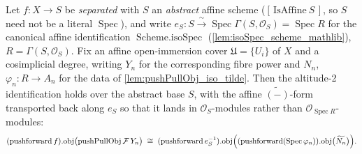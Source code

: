 \begin{lemma}\leanok
  \label{lem:pushPullObj_iso_tilde_affine}
  Let \(f : X \to S\) be \emph{separated} with \(S\) an \emph{abstract} affine scheme
  (\([\,\mathrm{IsAffine}\ S\,]\), so \(S\) need not be a literal \(\operatorname{Spec}\)), and
  write \(e_S : S \xrightarrow{\ \sim\ } \operatorname{Spec}\Gamma(S, \mathcal{O}_S) =
  \operatorname{Spec} R\) for the canonical affine identification \(\operatorname{Scheme.isoSpec}\)
  (\cref{lem:isoSpec_scheme_mathlib}), \(R = \Gamma(S, \mathcal{O}_S)\). Fix an affine
  open-immersion cover \(\mathfrak{U} = \{U_i\}\) of \(X\) and a cosimplicial degree, writing
  \(Y_n\) for the corresponding fibre power and \(N_n\), \(\varphi_n : R \to A_n\) for the data of
  \cref{lem:pushPullObj_iso_tilde}. Then the altitude-2 identification holds over the abstract
  base \(S\), with the affine \(\widetilde{(-)}\)-form transported back along \(e_S\) so that it
  lands in \(\mathcal{O}_S\)-modules rather than \(\mathcal{O}_{\operatorname{Spec} R}\)-modules:
  \[
    (\operatorname{pushforward} f).\!\operatorname{obj}\bigl(\operatorname{pushPullObj}
      \mathcal{F}\, Y_n\bigr)
    \;\cong\;
    (\operatorname{pushforward} e_S^{-1}).\!\operatorname{obj}\Bigl(
      (\operatorname{pushforward}(\operatorname{Spec}\varphi_n)).\!\operatorname{obj}\bigl(
        \widetilde{N_n}\bigr)\Bigr).
  \]
\end{lemma}
